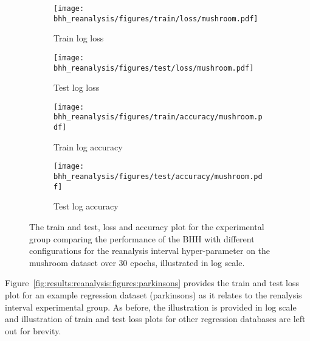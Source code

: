 \begin{figure}[H]
	\begin{subfigure}{0.5\textwidth}
		\centering
		\texttt{[image: bhh\_reanalysis/figures/train/loss/mushroom.pdf]}
		\caption{Train log loss}
		\label{fig:results:reanalysis:figures:loss:train:mushroom}
	\end{subfigure}
	\begin{subfigure}{0.5\textwidth}
		\centering
		\texttt{[image: bhh\_reanalysis/figures/test/loss/mushroom.pdf]}
		\caption{Test log loss}
		\label{fig:results:reanalysis:figures:loss:test:mushroom}
	\end{subfigure}
	\par\bigskip
	\begin{subfigure}{0.5\textwidth}
		\centering
		\texttt{[image: bhh\_reanalysis/figures/train/accuracy/mushroom.pdf]}
		\caption{Train log accuracy}
		\label{fig:results:reanalysis:figures:accuracy:train:mushroom}
	\end{subfigure}
	\begin{subfigure}{0.5\textwidth}
		\centering
		\texttt{[image: bhh\_reanalysis/figures/test/accuracy/mushroom.pdf]}
		\caption{Test log accuracy}
		\label{fig:results:reanalysis:figures:accuracy:test:mushroom}
	\end{subfigure}
	\par\bigskip
	\caption{The train and test, loss and accuracy plot for the experimental group comparing the performance of the \acs{BHH} with different configurations for the reanalysis interval hyper-parameter on the mushroom dataset over 30 epochs, illustrated in log scale.}
	\label{fig:results:reanalysis:figures:mushroom}
\end{figure}

Figure~\ref{fig:results:reanalysis:figures:parkinsons} provides the train and test loss plot for an example regression dataset (parkinsons) as it relates to the renalysis interval experimental group. As before, the illustration is provided in log scale and illustration of train and test loss plots for other regression databases are left out for brevity.

